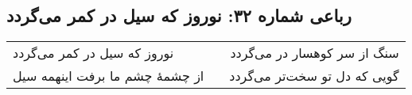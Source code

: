 \begin{center}
\section*{رباعی شماره ۳۲: نوروز که سیل در کمر می‌گردد}
\label{sec:032}
\begin{longtable}{l p{0.5cm} r}
نوروز که سیل در کمر می‌گردد
&&
سنگ از سر کوهسار در می‌گردد
\\
از چشمهٔ چشم ما برفت اینهمه سیل
&&
گویی که دل تو سخت‌تر می‌گردد
\\
\end{longtable}
\end{center}
